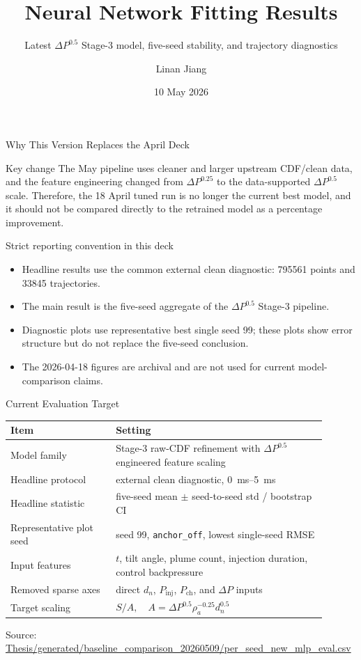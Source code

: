 \documentclass[aspectratio=169,11pt]{beamer}
\title[NN Fitting Results]{Neural Network Fitting Results}
\subtitle{Latest \texorpdfstring{\(\Delta P^{0.5}\)}{Delta P\textasciicircum 0.5} Stage-3 model, five-seed stability, and trajectory diagnostics}
\author{Linan Jiang}
\institute{Aalto University}
\date{10 May 2026}
\newcommand{\src}[1]{\vfill{\tiny\textcolor{gray!75!black}{Source: \url{#1}}}}
\begin{document}
\begin{frame}
  \titlepage
\end{frame}

\begin{frame}{Why This Version Replaces the April Deck}
\small
\begin{block}{Key change}
The May pipeline uses cleaner and larger upstream CDF/clean data, and the feature
engineering changed from \(\Delta P^{0.25}\) to the data-supported
\(\Delta P^{0.5}\) scale. Therefore, the 18 April tuned run is no longer the
current best model, and it should not be compared directly to the retrained model
as a percentage improvement.
\end{block}

\begin{block}{Strict reporting convention in this deck}
\begin{itemize}
  \item Headline results use the common external clean diagnostic:
  \num{795561} points and \num{33845} trajectories.
  \item The main result is the five-seed aggregate of the \(\Delta P^{0.5}\)
  Stage-3 pipeline.
  \item Diagnostic plots use representative best single seed 99; these plots show
  error structure but do not replace the five-seed conclusion.
  \item The 2026-04-18 figures are archival and are not used for current model-comparison claims.
\end{itemize}
\end{block}
\end{frame}

\begin{frame}{Current Evaluation Target}
\small
\begin{tabular}{L{0.30\linewidth}L{0.60\linewidth}}
\toprule
Item & Setting \\
\midrule
Model family & Stage-3 raw-CDF refinement with \(\Delta P^{0.5}\) engineered feature scaling \\
Headline protocol & external clean diagnostic, \SIrange{0}{5}{ms} \\
Headline statistic & five-seed mean \(\pm\) seed-to-seed std / bootstrap CI \\
Representative plot seed & seed 99, \texttt{anchor\_off}, lowest single-seed RMSE \\
Input features & \(t\), tilt angle, plume count, injection duration, control backpressure \\
Removed sparse axes & direct \(d_n\), \(P_{\mathrm{inj}}\), \(P_{\mathrm{ch}}\), and \(\Delta P\) inputs \\
Target scaling & \(S/A,\quad A=\Delta P^{0.5}\rho_a^{-0.25}d_n^{0.5}\) \\
\bottomrule
\end{tabular}

\src{Thesis/generated/baseline_comparison_20260509/per_seed_new_mlp_eval.csv}
\end{frame}
\end{document}
